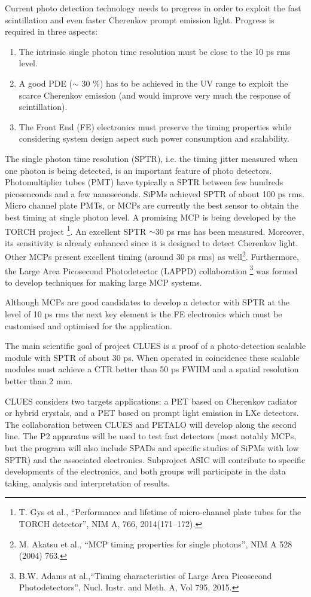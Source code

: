 Current photo detection technology needs to progress in order to exploit the fast scintillation and even faster Cherenkov prompt emission light. Progress is required in three aspects:
\begin{enumerate}
\item The intrinsic single photon time resolution must be close to the 10 ps rms level.
\item A good PDE ($\sim$ 30 \%) has to be achieved in the UV range to exploit the scarce Cherenkov emission (and would improve very much the response of scintillation). 
\item The Front End (FE) electronics must preserve the timing properties while considering
system design aspect such power consumption and scalability.
\end{enumerate}


The single photon time resolution (SPTR), i.e. the timing jitter measured when one photon is being detected, is an important feature of photo detectors. Photomultiplier tubes (PMT) have typically a SPTR between few hundreds picosenconds and a few nanoseconds. SiPMs achieved SPTR of about 100 ps rms. Micro channel plate PMTs, or MCPs are currently the best sensor to obtain the best timing at single photon level. A promising MCP is being developed by the TORCH project \footnote{T. Gys et al., ``Performance and lifetime of micro-channel plate tubes for the TORCH detector'', NIM A, 766, 2014(171--172).}. An excellent SPTR $\sim$30 ps rms has been measured. Moreover, its sensitivity is already enhanced since it is designed to detect Cherenkov light. Other MCPs present excellent timing (around 30 ps rms) as well\footnote{M. Akatsu et al., ``MCP timing properties for single photons'', NIM A 528 (2004) 763.}.
Furthermore, the Large Area Picosecond Photodetector (LAPPD) collaboration \footnote{B.W. Adams at al.,``Timing characteristics of Large Area Picosecond Photodetectors'', Nucl. Instr. and Meth. A, Vol 795, 2015.} was formed to develop techniques for making large MCP systems.
 
Although MCPs are good candidates to develop a detector with SPTR at the level of 10 ps rms the next key element is the FE electronics which must be customised and optimised for the application. 

The main scientific goal of project CLUES is a proof of a photo-detection scalable module with SPTR of about 30 ps. When operated in coincidence these scalable modules must achieve a CTR better than 50 ps FWHM and a spatial resolution better than 2 mm.

CLUES considers two targets applications: a PET based on Cherenkov radiator or hybrid crystals, and a
PET based on prompt light emission in LXe detectors. The collaboration between CLUES and PETALO will develop along the second line. The P2 apparatus will be used to test fast detectors (most notably MCPs, but the program will also include SPADs and specific studies of SiPMs with low SPTR) and the associated electronics. Subproject ASIC will contribute to specific developments of the electronics, and both groups will participate in the data taking, analysis and interpretation of results. 
